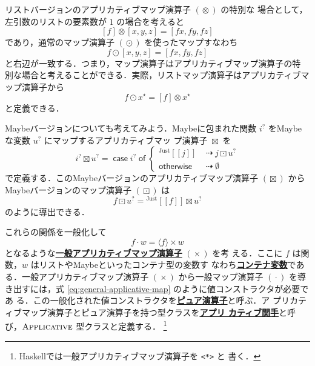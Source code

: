 \documentclass[a5paper,twoside,fleqn,draft]{jsbook}
\def\[{\left[\!\left[}
\def\]{\right]\!\right]}
\newcommand{\programminglanguage}[1]{\textsf{#1}}
\newcommand{\haskell}{\programminglanguage{Haskell}}
\newcommand{\keyword}[1]{{\underline{\textbf{#1}}}}
\newcommand{\code}[1]{\texttt{#1}}
\newcommand{\mKeyword}[1]{\mathsf{#1}} %
\newcommand{\mIfKeyword}{\mKeyword{if}}
\newcommand{\mCaseKeyword}{\mKeyword{case}}
\newcommand{\mOfKeyword}{\mKeyword{of}}
\newcommand{\mOtherwiseKeyword}{\mKeyword{otherwise}}
\DeclareMathOperator{\mCaseKW}{\mCaseKeyword} %
\DeclareMathOperator{\mIf}{\mIfKeyword}
\DeclareMathOperator{\mOfKW}{\mOfKeyword} %
\DeclareMathOperator{\mOtherwise}{\mOtherwiseKeyword}
\newcommand{\mNothing}{\emptyset}
\DeclareMathOperator{\mAppMap}{\times}
\DeclareMathOperator{\mAppMapList}{\otimes}
\DeclareMathOperator{\mAppMapMaybe}{\boxtimes}
\DeclareMathOperator{\mIfSo}{\dashrightarrow}
\DeclareMathOperator{\mLogicalAnd}{\wedge}
\DeclareMathOperator{\mMap}{\cdot} %
\DeclareMathOperator{\mMapList}{\odot}
\DeclareMathOperator{\mMapMaybe}{\boxdot}
\newcommand{\mValueConstructor}[1]{\mathrm{#1}}
\newcommand{\mGenericValueAssemble}[2]{{}^\mValueConstructor{#1}\[#2\]}
\newcommand{\mJustWith}[1]{\mGenericValueAssemble{Just}{#1}}
\newcommand{\mListWith}[1]{\left[#1\right]}
\newcommand{\mPureWith}[1]{\langle#1\rangle}
\newcommand{\mGenericTypeClass}[1]{\textsc{#1}} %
\newcommand{\mApplicativeTypeClass}{\mGenericTypeClass{Applicative}}
\newcommand{\mList}[1]{{#1}^\mathrm{\star}}
\newcommand{\mMaybe}[1]{{#1}^?}
\newcommand{\mCaseOf}[1]{\mCaseKW#1\mOfKW}
\begin{document}
リストバージョンのアプリカティブマップ演算子 $(\mAppMapList)$ の特別な
場合として，左引数のリストの要素数が $1$ の場合を考えると
\begin{equation}
\mListWith{f}\mAppMapList\mListWith{x,y,z}
=\mListWith{fx,fy,fz}
\end{equation}
であり，通常のマップ演算子 $(\mMapList)$ を使ったマップすなわち
\begin{equation}
f\mMapList\mListWith{x,y,z}
=\mListWith{fx,fy,fz}
\end{equation}
と右辺が一致する．つまり，マップ演算子はアプリカティブマップ演算子の特
別な場合と考えることができる．実際，リストマップ演算子はアプリカティブマップ演算子から
\begin{equation}
f\mMapList\mList{x}
=\mListWith{f}\mAppMapList\mList{x}
\end{equation}
と定義できる．

Maybeバージョンについても考えてみよう．Maybeに包まれた関数
$\mMaybe{i}$ をMaybeな変数 $\mMaybe{u}$ にマップするアプリカティブマッ
プ演算子 $\mAppMapMaybe$ を
\begin{equation}
\mMaybe{i}\mAppMapMaybe\mMaybe{u}
=\mCaseOf{\mMaybe{i}}\begin{cases}
\mJustWith{j}&\mIfSo j\mMapMaybe\mMaybe{u}\\
\mOtherwise&\mIfSo\mNothing
\end{cases}
\end{equation}
で定義する．このMaybeバージョンのアプリカティブマップ演算子
$(\mAppMapMaybe)$ からMaybeバージョンのマップ演算子 $(\mMapMaybe)$ は
\begin{equation}
f\mMapMaybe\mMaybe{u}
=\mJustWith{f}\mAppMapMaybe\mMaybe{u}
\end{equation}
のように導出できる．

これらの関係を一般化して
\begin{equation}
\label{eq:general-applicative-map}
f\mMap w=\mPureWith{f}\mAppMap w
\end{equation}
となるような\keyword{一般アプリカティブマップ演算子} $(\mAppMap)$ を考
える．ここに $f$ は関数，$w$ はリストやMaybeといったコンテナ型の変数す
なわち\keyword{コンテナ変数}である．一般アプリカティブマップ演算子
$(\mAppMap)$ から一般マップ演算子 $(\mMap)$ を導き出すには，式
\eqref{eq:general-applicative-map} のように値コンストラクタが必要であ
る．この一般化された値コンストラクタを\keyword{ピュア演算子}と呼ぶ．ア
プリカティブマップ演算子とピュア演算子を持つ型クラスを\keyword{アプリ
  カティブ関手}と呼び，$\mApplicativeTypeClass$ 型クラスと定義する．
\footnote{\haskell では一般アプリカティブマップ演算子を \code{<*>} と
  書く．}
\end{document}
